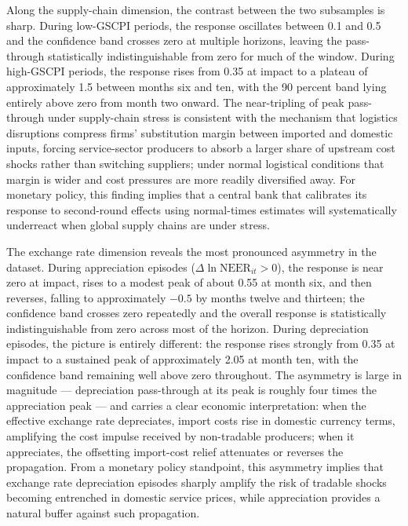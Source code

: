 Along the supply-chain dimension, the contrast between the two subsamples is sharp.
During low-GSCPI periods, the response oscillates between 0.1 and 0.5 and the confidence
band crosses zero at multiple horizons, leaving the pass-through statistically indistinguishable
from zero for much of the window.
During high-GSCPI periods, the response rises from 0.35 at impact to a plateau of
approximately 1.5 between months six and ten, with the 90 percent band lying entirely above
zero from month two onward.
The near-tripling of peak pass-through under supply-chain stress is consistent with the
mechanism that logistics disruptions compress firms' substitution margin between imported
and domestic inputs, forcing service-sector producers to absorb a larger share of upstream
cost shocks rather than switching suppliers; under normal logistical conditions that margin
is wider and cost pressures are more readily diversified away.
For monetary policy, this finding implies that a central bank that calibrates its response
to second-round effects using normal-times estimates will systematically underreact when
global supply chains are under stress.

The exchange rate dimension reveals the most pronounced asymmetry in the dataset.
During appreciation episodes ($\Delta\ln\mathrm{NEER}_{it} > 0$), the response is near
zero at impact, rises to a modest peak of about 0.55 at month six, and then reverses,
falling to approximately $-0.5$ by months twelve and thirteen; the confidence band crosses
zero repeatedly and the overall response is statistically indistinguishable from zero
across most of the horizon.
During depreciation episodes, the picture is entirely different: the response rises
strongly from 0.35 at impact to a sustained peak of approximately 2.05 at month ten,
with the confidence band remaining well above zero throughout.
The asymmetry is large in magnitude — depreciation pass-through at its peak is roughly
four times the appreciation peak — and carries a clear economic interpretation: when the
effective exchange rate depreciates, import costs rise in domestic currency terms, amplifying
the cost impulse received by non-tradable producers; when it appreciates, the offsetting
import-cost relief attenuates or reverses the propagation.
From a monetary policy standpoint, this asymmetry implies that exchange rate depreciation
episodes sharply amplify the risk of tradable shocks becoming entrenched in domestic
service prices, while appreciation provides a natural buffer against such propagation.


